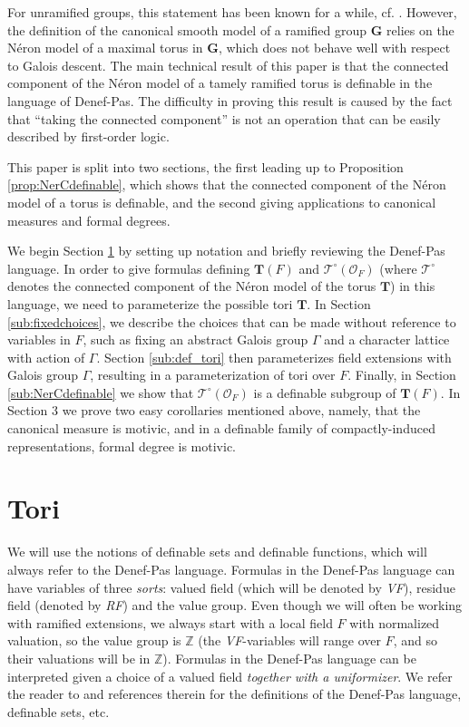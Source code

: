 \documentclass{amsart}
\newcommand{\Z}{{\mathbb Z}}
\newcommand{\ri}{\mathcal{O}}
\newcommand{\bG}{\mathbf{G}}
\newcommand{\bT}{\mathbf {T}}
\newcommand{\NerC}[1]{\mathcal{#1}^\circ}
\theoremstyle{plain}
\theoremstyle{definition}
\begin{document}
For unramified groups, this statement has been known for a while, cf. \cite{cluckers-hales-loeser}.
However, the definition of the canonical smooth model of a ramified group $\bG$ relies on the
N\'eron model of a maximal torus in $\bG$, which does not behave well with respect to Galois descent.
The main technical result of this paper is that the connected component of the N\'eron model
of a tamely ramified torus is definable in the language of Denef-Pas. The difficulty in proving this result
is caused by the fact that ``taking the connected component'' is not an operation that can be easily
described by first-order logic. 

This paper is split into two sections, the first leading up to Proposition \ref{prop:NerCdefinable},
which shows that the connected component of the N\'eron model of a torus is definable,
and the second giving applications to canonical measures and formal degrees.

We begin Section \ref{sec:tori} by setting up notation and briefly reviewing the Denef-Pas language.  In order
to give formulas defining $\bT(F)$ and $\NerC{T}(\ri_F)$  (where $\NerC{T}$ denotes the connected
component of the N\'eron model of the torus $\bT$) in this language, we need to parameterize the possible tori $\bT$.
In Section \ref{sub:fixedchoices}, we describe the choices that can be made without reference to variables in $F$,
such as fixing an abstract Galois group $\Gamma$ and a character lattice with action of $\Gamma$.
Section \ref{sub:def_tori} then parameterizes field extensions with Galois group $\Gamma$, resulting in a parameterization
of tori over $F$.  Finally, in Section \ref{sub:NerCdefinable} we show that $\NerC{T}(\ri_F)$ is a definable subgroup of $\bT(F)$.
In Section 3 we prove two easy corollaries mentioned above, namely, that the canonical measure is motivic,
and in a definable family of compactly-induced representations, formal degree is motivic. 

\section{Tori} \label{sec:tori}
We will use the notions of definable sets and definable functions, which will always refer to the Denef-Pas language. 
Formulas in the Denef-Pas language can have variables of three \emph{sorts}: valued field (which will be denoted by \emph{VF}),
residue field (denoted by \emph{RF}) and the value group. Even though we will often be working with ramified extensions,
we always start with a local field $F$ with normalized valuation, so the value group is $\Z$
(the \emph{VF}-variables will range over $F$, and so their valuations will be in $\Z$).
Formulas in the Denef-Pas language can be interpreted given a choice of a valued field \emph{together with a uniformizer}. 
We refer the reader to \cite{CGH-ad} and references therein for the definitions of the Denef-Pas language, definable sets, etc. 
\end{document}
